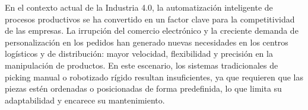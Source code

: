 En el contexto actual de la Industria 4.0, la automatización inteligente de procesos productivos se ha convertido en un factor
clave para la competitividad de las empresas. La irrupción del comercio electrónico y la creciente demanda de personalización en
los pedidos han generado nuevas necesidades en los centros logísticos y de distribución: mayor velocidad, flexibilidad y precisión
en la manipulación de productos. En este escenario, los sistemas tradicionales de picking manual o robotizado rígido resultan
insuficientes, ya que requieren que las piezas estén ordenadas o posicionadas de forma predefinida, lo que limita su adaptabilidad
y encarece su mantenimiento.
